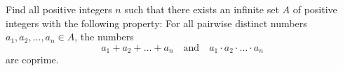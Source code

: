 Find all positive integers $n$ such that there exists an infinite set $A$ of positive integers
with the following property:
For all pairwise distinct numbers $a_1,a_2,\ldots,a_n\in A$, the numbers 
$$a_1+a_2+\ldots+a_n\quad \text{and}\quad a_1\cdot a_2\cdot\ldots\cdot a_n$$
are coprime.
